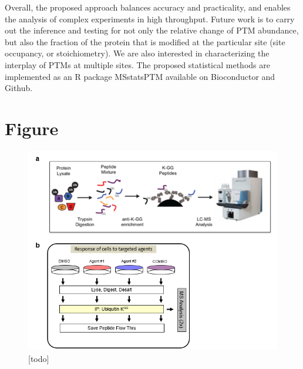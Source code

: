 \documentclass[mcp]{article}
\numberwithin{figure}{section} %
\numberwithin{table}{section}
\def\todo#1{{\color{red}[#1]}}
\begin{document}
Overall, the proposed approach balances accuracy and practicality, and enables the analysis of complex experiments in high throughput. Future work is to carry out the inference and testing for not only the relative change of PTM abundance, but also the fraction of the protein that is modified at the particular site (site occupancy, or stoichiometry). We are also interested in characterizing the interplay of PTMs at multiple sites. The proposed statistical methods are implemented as an R package MSstatsPTM available on Bioconductor and Github.

\newpage
\printbibliography


\newpage
\section{Figure}

\begin{figure}[ht]
\centering
\includegraphics[scale=.8]{images/fig1.png}
\caption{\todo{todo}}
\label{fig:workflow}
\end{figure}
\end{document}
